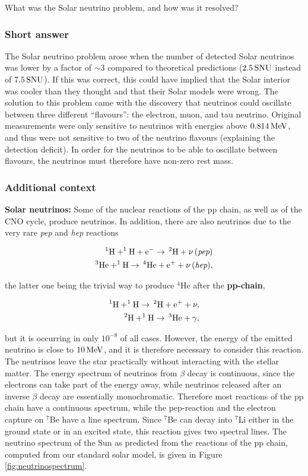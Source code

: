 \documentclass[a4paper,10pt]{article}
\begin{document}
What was the Solar neutrino problem, and how was it resolved?

\subsubsection{Short answer}

The Solar neutrino problem arose when the number of detected Solar neutrinos was lower by a factor of $\sim3$ compared to theoretical predictions ($2.5\,{\rm SNU}$ instead of $7.5\,{\rm SNU}$). If this was correct, this could have implied that the Solar interior was cooler than they thought and that their Solar models were wrong. The solution to this problem came with the discovery that neutrinos could oscillate between three different ``flavours'': the electron, muon, and tau neutrino. Original measurements were only sensitive to neutrinos with energies above $0.814\,{\rm MeV}$, and thus were not sensitive to two of the neutrino flavours (explaining the detection deficit). In order for the neutrinos to be able to oscillate between flavours, the neutrinos must therefore have non-zero rest mass.

\subsubsection{Additional context}

{\noindent}\textbf{Solar neutrinos:} Some of the nuclear reactions of the pp chain, as well as of the CNO cycle, produce neutrinos. In addition, there are also neutrinos due to the very rare \textit{pep} and \textit{hep} reactions

\begin{align*}
    {\rm ^1H+^1H+e^- \rightarrow\,^2H+\nu\,(\textit{pep})} \\
    {\rm ^3He+^1H \rightarrow\,^4He+e^++\nu\,(\textit{hep})},
\end{align*}

{\noindent}the latter one being the trivial way to produce $^4$He after the \textbf{pp-chain},

\begin{align*}
    {\rm ^1H+^1H \rightarrow\,^2H+e^++\nu,} \\
    {\rm ^2H+^1H \rightarrow \,^3He+\gamma},
\end{align*}

{\noindent}but it is occurring in only $10^{-8}$ of all cases. However, the energy of the emitted neutrino is close to $10\,{\rm MeV}$, and it is therefore necessary to consider this reaction. The neutrinos leave the star practically without interacting with the stellar matter. The energy spectrum of neutrinos from $\beta$ decay is continuous, since the electrons can take part of the energy away, while neutrinos released after an inverse $\beta$ decay are essentially monochromatic. Therefore most reactions of the pp chain have a continuous spectrum, while the pep-reaction and the electron capture on $^7$Be have a line spectrum. Since $^7$Be can decay into $^7$Li either in the ground state or in an excited state, this reaction gives two spectral lines. The neutrino spectrum of the Sun as predicted from the reactions of the pp chain, computed from our standard solar model, is given in Figure \ref{fig:neutrinospectrum}.
\end{document}
